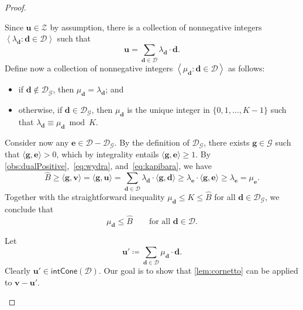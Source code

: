 \documentclass{article}
\renewcommand{\leq}{\leqslant}
\renewcommand{\geq}{\geqslant}
\newcommand{\Dd}{\mathcal{D}}
\newcommand{\tup}[1]{{\mathbf{#1}}}
\renewcommand{\gg}{\tup g}
\newcommand{\dd}{\tup d}
\newcommand{\ee}{\tup e}
\newcommand{\uu}{\tup u}
\newcommand{\myvv}{\tup v} %
\newcommand{\mset}[1]{\left\langle #1\right\rangle}
\newcommand{\Gg}{\mathcal{G}}
\newcommand{\Zz}{\mathcal{Z}}
\newcommand{\sca}[2]{\langle #1,#2\rangle}
\renewcommand{\setminus}{-}
\newcommand{\intcone}{\mathsf{intCone}}
\begin{document}
\begin{proof}
\begin{subproof}
 Since $\uu\in \Zz$ by assumption, there is a collection of nonnegative integers $\mset{\lambda_\dd\colon \dd\in \Dd}$ such that
 $$\uu=\sum_{\dd\in \Dd} \lambda_\dd\cdot \dd.$$
 Define now a collection of nonnegative integers $\mset{\mu_\dd\colon \dd\in \Dd}$ as follows:
 \begin{itemize}[nosep]
  \item if $\dd\notin \Dd_\Gg$, then $\mu_\dd=\lambda_\dd$; and
  \item otherwise, if $\dd\in \Dd_\Gg$, then $\mu_\dd$ is the unique integer in $\{0,1,\ldots,K-1\}$ such that $\lambda_\dd\equiv \mu_\dd\bmod K$.
 \end{itemize}
 Consider now any $\ee\in \Dd\setminus \Dd_\Gg$. By the definition of $\Dd_\Gg$, there exists $\gg\in \Gg$ such that $\sca{\gg}{\ee}>0$, which by integrality entails $\sca{\gg}{\ee}\geq 1$. By \cref{obs:dualPositive},~\cref{eq:wydra}, and~\cref{eq:kapibara}, we have
 $$\widehat{B}\geq \sca{\gg}{\myvv}=\sca{\gg}{\uu}=\sum_{\dd\in \Dd} \lambda_\dd\cdot \sca{\gg}{\dd} \geq \lambda_{\ee}\cdot \sca{\gg}{\ee}\geq \lambda_\ee=\mu_\ee.$$
 Together with the straightforward inequality $\mu_\dd\leq K\leq \widehat{B}$ for all $\dd\in \Dd_\Gg$, we conclude that
 \begin{equation}\label{eq:nutria}
  \mu_\dd\leq \widehat{B}\qquad \textrm{for all }\dd\in \Dd.
 \end{equation}

 Let
 $$\uu'\coloneqq \sum_{\dd\in \Dd} \mu_\dd\cdot \dd.$$
 Clearly $\uu'\in \intcone(\Dd)$. Our goal is to show that \cref{lem:cornetto} can be applied to $\myvv-\uu'$.


\end{subproof}
\end{proof}
\end{document}
